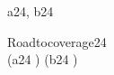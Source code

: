 \begin{circus}
\circchannel a24, b24 \\
\end {circus}
\begin {circus}
\circprocess Roadtocoverage24 \circdef \circbegin \\
  \circspot (a24 \then \Skip)
    \interleave
    (b24 \then \Skip) \\
\circend
\end{circus}

